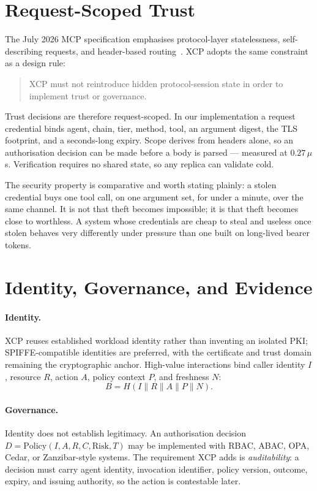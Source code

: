 \documentclass[11pt]{article}
\begin{document}
\section{Request-Scoped Trust}

The July 2026 MCP specification emphasises protocol-layer statelessness,
self-describing requests, and header-based routing~\cite{mcp2026}. XCP adopts the
same constraint as a design rule:

\begin{quote}
XCP must not reintroduce hidden protocol-session state in order to implement
trust or governance.
\end{quote}

Trust decisions are therefore request-scoped. In our implementation a request
credential binds agent, chain, tier, method, tool, an argument digest, the TLS
footprint, and a seconds-long expiry. Scope derives from headers alone, so an
authorisation decision can be made before a body is parsed --- measured at
$0.27\,\mu$s. Verification requires no shared state, so any replica can validate
cold.

The security property is comparative and worth stating plainly: a stolen
credential buys one tool call, on one argument set, for under a minute, over the
same channel. It is not that theft becomes impossible; it is that theft becomes
close to worthless. A system whose credentials are cheap to steal and useless
once stolen behaves very differently under pressure than one built on long-lived
bearer tokens.

\section{Identity, Governance, and Evidence}

\paragraph{Identity.} XCP reuses established workload identity rather than
inventing an isolated PKI; SPIFFE-compatible identities are preferred, with the
certificate and trust domain remaining the cryptographic anchor. High-value
interactions bind caller identity $I$, resource $R$, action $A$, policy context
$P$, and freshness $N$:
\[ B = H(I \parallel R \parallel A \parallel P \parallel N). \]

\paragraph{Governance.} Identity does not establish legitimacy. An authorisation
decision $D = \mathrm{Policy}(I, A, R, C, \mathrm{Risk}, T)$ may be implemented
with RBAC, ABAC, OPA, Cedar, or Zanzibar-style systems. The requirement XCP adds
is \emph{auditability}: a decision must carry agent identity, invocation
identifier, policy version, outcome, expiry, and issuing authority, so the action
is contestable later.
\end{document}
